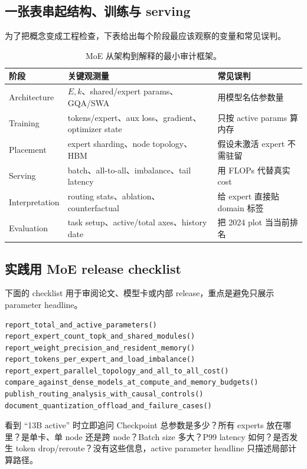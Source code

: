 \subsection{一张表串起结构、训练与 serving}

为了把概念变成工程检查，下表给出每个阶段最应该观察的变量和常见误判。

\begin{table}[H]
\centering
\small
\begin{tabularx}{\textwidth}{L{0.16\textwidth} L{0.27\textwidth} X}
\toprule
阶段 & 关键观测量 & 常见误判 \\
\midrule
Architecture & $E,k$、shared/expert params、GQA/SWA & 用模型名估参数量 \\
Training & tokens/expert、aux loss、gradient、optimizer state & 只按 active params 算内存 \\
Placement & expert sharding、node topology、HBM & 假设未激活 expert 不需驻留 \\
Serving & batch、all-to-all、imbalance、tail latency & 用 FLOPs 代替真实 cost \\
Interpretation & routing stats、ablation、counterfactual & 给 expert 直接贴 domain 标签 \\
Evaluation & task setup、active/total axes、history date & 把 2024 plot 当当前排名 \\
\bottomrule
\end{tabularx}
\caption{MoE 从架构到解释的最小审计框架。}
\end{table}

\subsection{实践用 MoE release checklist}

下面的 checklist 用于审阅论文、模型卡或内部 release，重点是避免只展示 parameter headline。

\begin{lstlisting}[caption={Sparse MoE release checklist}]
report_total_and_active_parameters()
report_expert_count_topk_and_shared_modules()
report_weight_precision_and_resident_memory()
report_tokens_per_expert_and_load_imbalance()
report_expert_parallel_topology_and_all_to_all_cost()
compare_against_dense_models_at_compute_and_memory_budgets()
publish_routing_analysis_with_causal_controls()
document_quantization_offload_and_failure_cases()
\end{lstlisting}

\begin{warningbox}{看到 “13B active” 时立即追问}
Checkpoint 总参数是多少？所有 experts 放在哪里？是单卡、单 node 还是跨 node？Batch size 多大？P99 latency 如何？是否发生 token drop/reroute？没有这些信息，active parameter headline 只描述局部计算路径。
\end{warningbox}


